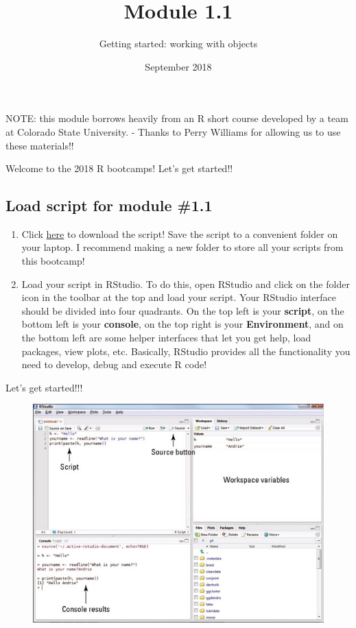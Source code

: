 \documentclass[]{article}
\title{Module 1.1}
\author{Getting started: working with objects}
\date{September 2018}
\begin{document}
\maketitle

NOTE: this module borrows heavily from an R short course developed by a
team at Colorado State University. - Thanks to Perry Williams for
allowing us to use these materials!!

Welcome to the 2018 R bootcamps! Let's get started!!

\subsection{Load script for module
\#1.1}\label{load-script-for-module-1.1}

\begin{enumerate}
\def\labelenumi{\arabic{enumi}.}
\item
  Click \href{module1_1.R}{here} to download the script! Save the script
  to a convenient folder on your laptop. I recommend making a new folder
  to store all your scripts from this bootcamp!
\item
  Load your script in RStudio. To do this, open RStudio and click on the
  folder icon in the toolbar at the top and load your script. Your
  RStudio interface should be divided into four quadrants. On the top
  left is your \textbf{script}, on the bottom left is your
  \textbf{console}, on the top right is your \textbf{Environment}, and
  on the bottom left are some helper interfaces that let you get help,
  load packages, view plots, etc. Basically, RStudio provides all the
  functionality you need to develop, debug and execute R code!
\end{enumerate}

Let's get started!!!

\begin{figure}
\centering
\includegraphics{rstudio1.jpg}
\caption{}
\end{figure}
\end{document}
